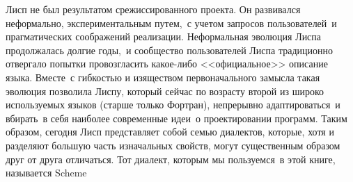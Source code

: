 Лисп не был результатом срежиссированного проекта.
Он развивался не\-фор\-маль\-но, экспериментальным путем,~с учетом  
запросов пользователей~и прагматических соображений реализации.
Неформальная эволюция Лиспа продолжалась долгие годы,~и сообщество
пользователей Лиспа традиционно отвергало попытки провозгласить
какое-либо <<официальное>> описание языка.  Вместе~с гибкостью и
изяществом первоначального замысла такая эволюция позволила Лиспу,
который сейчас по возрасту второй из широко используемых языков (старше только
Фортран), непрерывно адаптироваться~и вбирать~в себя
наиболее современные идеи~о проектировании программ.  Таким образом,
сегодня Лисп представляет собой семью диалектов, которые, хотя и
разделяют большую часть изначальных свойств, могут существенным
образом друг от друга отличаться.  Тот диалект, которым мы пользуемся~в 
этой книге, называется 
Scheme
